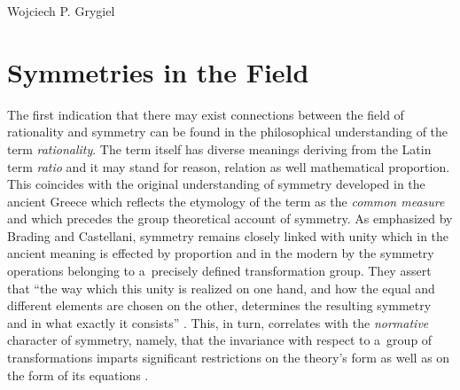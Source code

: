 \begin{artengenv}{Wojciech P. Grygiel}
\section*{Symmetries in the Field}

The first indication that there may exist connections between the field of rationality and symmetry can be found in the philosophical understanding of the term \textit{rationality}. The term itself has diverse meanings deriving from the Latin term \textit{ratio} and it may stand for reason, relation as well mathematical proportion. This coincides with the original understanding of symmetry developed in the ancient Greece which reflects the etymology of the term as the \textit{common measure} and which precedes the group theoretical account of symmetry. As emphasized by Brading and Castellani, symmetry remains closely linked with unity which in the ancient meaning is effected by proportion and in the modern by the symmetry operations belonging to a~precisely defined transformation group. They assert that ``the way which this unity is realized on one hand, and how the equal and different elements are chosen on the other, determines the resulting symmetry and in what exactly it consists'' 
\parencite[][p.3]{brading_introduction_2003}. %
 This, in turn, correlates with the \textit{normative} character of symmetry, namely, that the invariance with respect to a~group of transformations imparts significant restrictions on the theory's form as well as on the form of its equations 
\parencite[][p.13]{brading_introduction_2003}.%





\end{artengenv}
